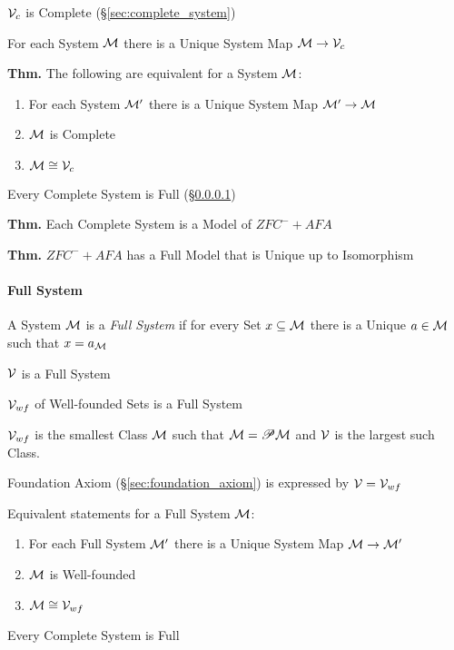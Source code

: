 $\mathcal{V}_c$ is Complete (\S\ref{sec:complete_system})

For each System $\mathcal{M}$ there is a Unique System Map $\mathcal{M}
\to \mathcal{V}_c$

\textbf{Thm.} The following are equivalent for a System $\mathcal{M}$:
\begin{enumerate}
  \item For each System $\mathcal{M}'$ there is a Unique System Map
    $\mathcal{M}' \to \mathcal{M}$
  \item $\mathcal{M}$ is Complete
  \item $\mathcal{M} \cong \mathcal{V}_c$
\end{enumerate}

Every Complete System is Full (\S\ref{sec:full_system})

\textbf{Thm.} Each Complete System is a Model of $ZFC^- + AFA$

\textbf{Thm.} $ZFC^- + AFA$ has a Full Model that is Unique up to
Isomorphism



\paragraph{Full System}\label{sec:full_system}\hfill

A System $\mathcal{M}$ is a \emph{Full System} if for every Set $x
\subseteq \mathcal{M}$ there is a Unique $a \in \mathcal{M}$ such that $x
= a_\mathcal{M}$

$\mathcal{V}$ is a Full System

$\mathcal{V}_{wf}$ of Well-founded Sets is a Full System

$\mathcal{V}_{wf}$ is the smallest Class $\mathcal{M}$ such that
$\mathcal{M} = \mathscr{P}\mathcal{M}$ and $\mathcal{V}$ is the largest such Class.

Foundation Axiom (\S\ref{sec:foundation_axiom}) is expressed by
$\mathcal{V} = \mathcal{V}_{wf}$

Equivalent statements for a Full System $\mathcal{M}$:
\begin{enumerate}
  \item For each Full System $\mathcal{M}'$ there is a Unique System Map
    $\mathcal{M} \to \mathcal{M}'$
  \item $\mathcal{M}$ is Well-founded
  \item $\mathcal{M} \cong \mathcal{V}_{wf}$
\end{enumerate}

Every Complete System is Full



